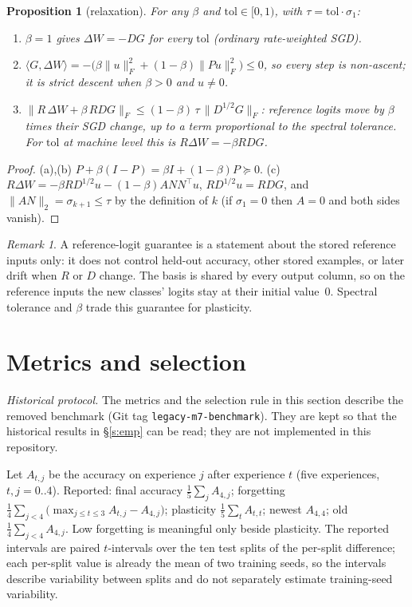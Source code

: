 \documentclass[11pt,a4paper]{article}
\newtheorem{prop}{Proposition}
\theoremstyle{remark}\newtheorem*{rem}{Remark}
\begin{document}
\begin{prop}[relaxation]\label{p:rel}
For any $\beta$ and $\mathrm{tol}\in[0,1)$, with $\tau=\mathrm{tol}\cdot\sigma_1$:
\begin{enumerate}[label=(\alph*)]
\item $\beta=1$ gives $\Delta W=-DG$ for every $\mathrm{tol}$ (ordinary rate-weighted SGD).
\item $\langle G,\Delta W\rangle=-\big(\beta\|u\|_F^2+(1-\beta)\|Pu\|_F^2\big)\le0$, so every step is non-ascent; it is strict descent when $\beta>0$ and $u\neq0$.
\item $\|R\,\Delta W+\beta\,RDG\|_F\le(1-\beta)\,\tau\,\|D^{1/2}G\|_F$: reference logits move by $\beta$ times
their SGD change, up to a term proportional to the spectral tolerance. For $\mathrm{tol}$ at machine level this is $R\Delta W=-\beta RDG$.
\end{enumerate}
\end{prop}
\begin{proof}
(a),(b) $P+\beta(I-P)=\beta I+(1-\beta)P\succeq0$. (c) $R\Delta W=-\beta RD^{1/2}u-(1-\beta)AN N^\top u$,
$RD^{1/2}u=RDG$, and $\|AN\|_2=\sigma_{k+1}\le\tau$ by the definition of $k$ (if $\sigma_1=0$ then $A=0$ and both sides vanish).
\end{proof}

\begin{rem}
A reference-logit guarantee is a statement about the stored reference inputs only: it does not control
held-out accuracy, other stored examples, or later drift when $R$ or $D$ change. The basis is shared by
every output column, so on the reference inputs the new classes' logits stay at their initial value~$0$.
Spectral tolerance and $\beta$ trade this guarantee for plasticity.
\end{rem}

\section{Metrics and selection}
\emph{Historical protocol.} The metrics and the selection rule in this section describe the removed benchmark
(Git tag \texttt{legacy-m7-benchmark}). They are kept so that the historical results in \S\ref{s:emp} can be read;
they are not implemented in this repository.

Let $A_{t,j}$ be the accuracy on experience $j$ after experience $t$ (five experiences, $t,j=0..4$). Reported:
final accuracy $\tfrac15\sum_jA_{4,j}$; forgetting $\tfrac14\sum_{j<4}\big(\max_{j\le t\le3}A_{t,j}-A_{4,j}\big)$;
plasticity $\tfrac15\sum_tA_{t,t}$; newest $A_{4,4}$; old $\tfrac14\sum_{j<4}A_{4,j}$. Low forgetting is
meaningful only beside plasticity. The reported intervals are paired $t$-intervals over the ten test splits
of the per-split difference; each per-split value is already the mean of two training seeds, so the
intervals describe variability between splits and do not separately estimate training-seed variability.
\end{document}
